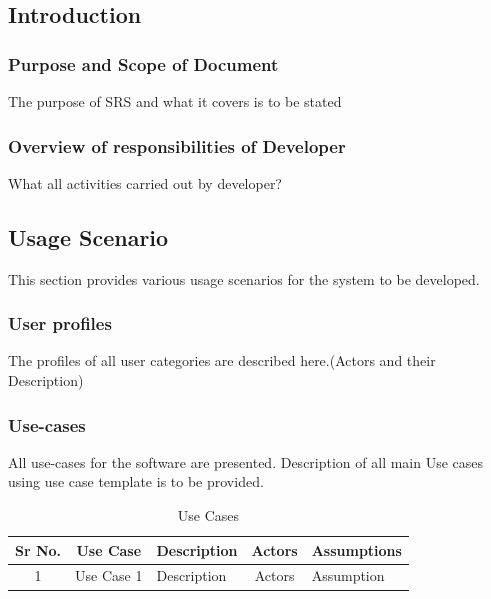 \documentclass[12pt,a4paper]{article}
\begin{document}
\subsection{Introduction}
\subsubsection{Purpose and Scope of Document}
The purpose of SRS and what it covers is to be stated 

\subsubsection{Overview of responsibilities of Developer}
What all activities carried out by developer?
  
\subsection{Usage Scenario}
This section provides various usage scenarios for the system to be developed.  
 \subsubsection{User profiles}  
The profiles of all user categories are described here.(Actors and their Description)

\subsubsection{Use-cases}
All use-cases for the software are presented. Description of all main Use cases using use case template is to be provided.

\begin{table}[!htbp]
\begin{center}
\def\arraystretch{1.5}
\begin{tabularx}{\textwidth}{| c | c | X | c | X |}
\hline
Sr No.	& Use Case	& Description	& Actors	& Assumptions \\
\hline
1& Use Case 1 & Description & Actors & Assumption \\
\hline
\end{tabularx}
\end{center}
\caption{Use Cases}
\label{tab:usecase}
\end{table}
\end{document}
